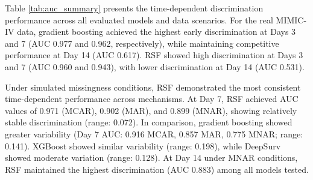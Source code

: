 \documentclass[pdflatex,sn-mathphys-num]{sn-jnl}%
\theoremstyle{thmstyleone}%
\theoremstyle{thmstyletwo}%
\theoremstyle{thmstylethree}%
\begin{document}
Table \ref{tab:auc_summary} presents the time-dependent discrimination performance across all evaluated models and data scenarios. For the real MIMIC-IV data, gradient boosting achieved the highest early discrimination at Days 3 and 7 (AUC 0.977 and 0.962, respectively), while maintaining competitive performance at Day 14 (AUC 0.617). RSF showed high discrimination at Days 3 and 7 (AUC 0.960 and 0.943), with lower discrimination at Day 14 (AUC 0.531).

Under simulated missingness conditions, RSF demonstrated the most consistent time-dependent performance across mechanisms. At Day 7, RSF achieved AUC values of 0.971 (MCAR), 0.902 (MAR), and 0.899 (MNAR), showing relatively stable discrimination (range: 0.072). In comparison, gradient boosting showed greater variability (Day 7 AUC: 0.916 MCAR, 0.857 MAR, 0.775 MNAR; range: 0.141). XGBoost showed similar variability (range: 0.198), while DeepSurv showed moderate variation (range: 0.128). At Day 14 under MNAR conditions, RSF maintained the highest discrimination (AUC 0.883) among all models tested.
\end{document}
